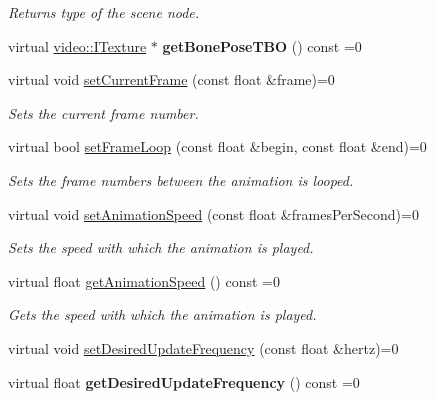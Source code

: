 \begin{DoxyCompactItemize}
\begin{DoxyCompactList}\small\item\em Returns type of the scene node. \end{DoxyCompactList}\item 
virtual \hyperlink{classirr_1_1video_1_1ITexture}{video\+::\+I\+Texture} $\ast$ {\bfseries get\+Bone\+Pose\+T\+BO} () const  =0\hypertarget{classirr_1_1scene_1_1ISkinnedMeshSceneNode_a3f2df0084ecc0944f61c748e3393e8d3}{}\label{classirr_1_1scene_1_1ISkinnedMeshSceneNode_a3f2df0084ecc0944f61c748e3393e8d3}

\item 
virtual void \hyperlink{classirr_1_1scene_1_1ISkinnedMeshSceneNode_ad545607e976621e97fe2df6aed1740e5}{set\+Current\+Frame} (const float \&frame)=0
\begin{DoxyCompactList}\small\item\em Sets the current frame number. \end{DoxyCompactList}\item 
virtual bool \hyperlink{classirr_1_1scene_1_1ISkinnedMeshSceneNode_a9fe34b9fd091c5910f3fecedd90a30d5}{set\+Frame\+Loop} (const float \&begin, const float \&end)=0
\begin{DoxyCompactList}\small\item\em Sets the frame numbers between the animation is looped. \end{DoxyCompactList}\item 
virtual void \hyperlink{classirr_1_1scene_1_1ISkinnedMeshSceneNode_ae0c03f0f2db8fa1c58b2de49c3d31352}{set\+Animation\+Speed} (const float \&frames\+Per\+Second)=0
\begin{DoxyCompactList}\small\item\em Sets the speed with which the animation is played. \end{DoxyCompactList}\item 
virtual float \hyperlink{classirr_1_1scene_1_1ISkinnedMeshSceneNode_ad66f474edadb93b8cfbaa567ce667772}{get\+Animation\+Speed} () const  =0
\begin{DoxyCompactList}\small\item\em Gets the speed with which the animation is played. \end{DoxyCompactList}\item 
virtual void \hyperlink{classirr_1_1scene_1_1ISkinnedMeshSceneNode_aaac892e54cfa06a6e98ffd3cafe6646f}{set\+Desired\+Update\+Frequency} (const float \&hertz)=0
\item 
virtual float {\bfseries get\+Desired\+Update\+Frequency} () const  =0\hypertarget{classirr_1_1scene_1_1ISkinnedMeshSceneNode_a843c025365cc2650d4c6f866aed4140b}{}\label{classirr_1_1scene_1_1ISkinnedMeshSceneNode_a843c025365cc2650d4c6f866aed4140b}


\end{DoxyCompactItemize}
